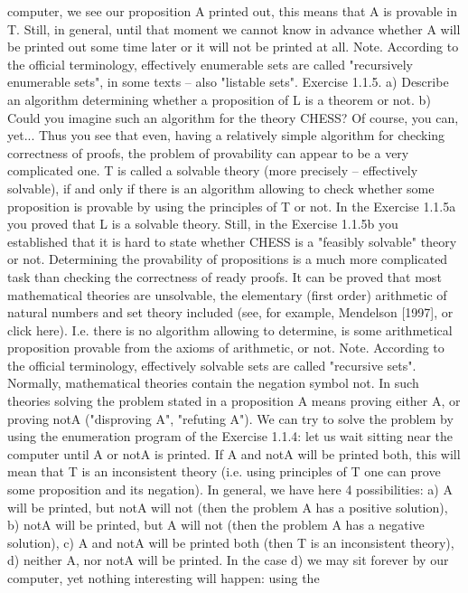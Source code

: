 computer, we see our proposition A printed out, this means that A is provable in T. Still, in general, until
that moment we cannot know in advance whether A will be printed out some time later or it will not be
printed at all.
Note. According to the official terminology, effectively enumerable sets are called "recursively
enumerable sets", in some texts – also "listable sets".
Exercise 1.1.5. a) Describe an algorithm determining whether a proposition of L is a theorem or not.
b) Could you imagine such an algorithm for the theory CHESS? Of course, you can, yet... Thus you see
that even, having a relatively simple algorithm for checking correctness of proofs, the problem of
provability can appear to be a very complicated one.
T is called a solvable theory (more precisely – effectively solvable), if and only if there is an algorithm
allowing to check whether some proposition is provable by using the principles of T or not. In the
Exercise 1.1.5a you proved that L is a solvable theory. Still, in the Exercise 1.1.5b you established that it
is hard to state whether CHESS is a "feasibly solvable" theory or not. Determining the provability of
propositions is a much more complicated task than checking the correctness of ready proofs. It can
be proved that most mathematical theories are unsolvable, the elementary (first order) arithmetic of
natural numbers and set theory included (see, for example, Mendelson [1997], or click here). I.e. there is
no algorithm allowing to determine, is some arithmetical proposition provable from the axioms of
arithmetic, or not.
Note. According to the official terminology, effectively solvable sets are called "recursive sets".
Normally, mathematical theories contain the negation symbol not. In such theories solving the problem
stated in a proposition A means proving either A, or proving notA ("disproving A", "refuting A"). We can
try to solve the problem by using the enumeration program of the Exercise 1.1.4: let us wait sitting near
the computer until A or notA is printed. If A and notA will be printed both, this will mean that T is an
inconsistent theory (i.e. using principles of T one can prove some proposition and its negation). In
general, we have here 4 possibilities:
a) A will be printed, but notA will not (then the problem A has a positive solution),
b) notA will be printed, but A will not (then the problem A has a negative solution),
c) A and notA will be printed both (then T is an inconsistent theory),
d) neither A, nor notA will be printed.
In the case d) we may sit forever by our computer, yet nothing interesting will happen: using the
